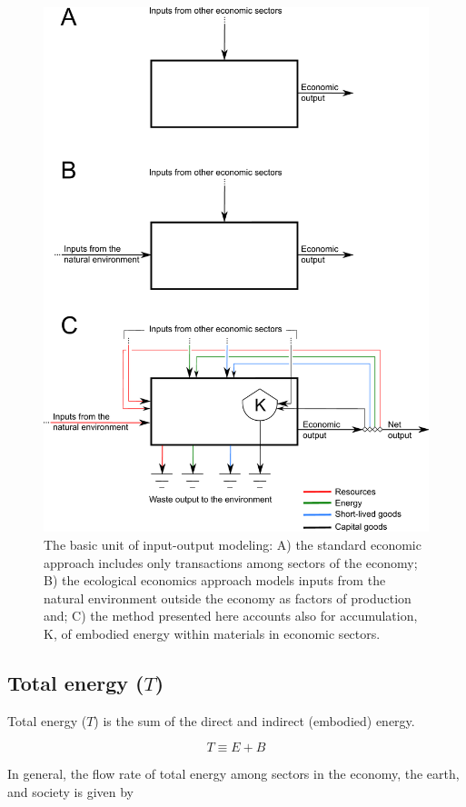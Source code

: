 \documentclass[authoryear,preprint,review,12pt]{elsarticle}
\begin{document}
\begin{figure}[H]
\includegraphics[width=0.8\linewidth]{images/Basic_unit_v5.pdf}
\caption{The basic unit of input-output modeling: A) the standard economic approach includes only transactions among sectors of the economy; B) the ecological economics approach models inputs from the natural environment outside the economy as factors of production and; C) the method presented here accounts also for accumulation, K, of embodied energy within materials in economic sectors.}
\label{fig:basic_unit}
\end{figure}

\subsection{Total energy ($T$)}

Total energy ($T$) is the sum of the direct and indirect (embodied) energy.

\begin{equation} \label{eq:T_def}
	T \equiv E + B
\end{equation}

In general, the flow rate of total energy among sectors in the economy, the earth, and society is given by
\end{document}
